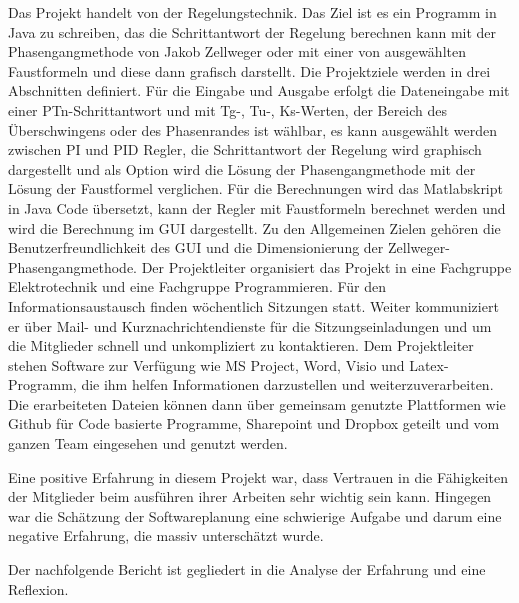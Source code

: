 Das Projekt handelt von der Regelungstechnik. Das Ziel ist es ein Programm in Java zu schreiben,
das die Schrittantwort der Regelung berechnen kann mit der Phasengangmethode von Jakob Zellweger
oder mit einer von ausgewählten Faustformeln und diese dann grafisch darstellt.\textcurrency 
Die Projektziele werden in drei Abschnitten definiert. Für die Eingabe und Ausgabe erfolgt die
Dateneingabe mit einer PTn-Schrittantwort und mit Tg-, Tu-, Ks-Werten, der Bereich des Überschwingens
oder des Phasenrandes ist wählbar, es kann ausgewählt werden zwischen PI und PID Regler, die
Schrittantwort der Regelung wird graphisch dargestellt und als Option wird die Lösung der Phasengangmethode
mit der Lösung der Faustformel verglichen. Für die Berechnungen wird das Matlabskript in Java
Code übersetzt, kann der Regler mit Faustformeln berechnet werden und wird die Berechnung im GUI
dargestellt. Zu den Allgemeinen Zielen gehören die Benutzerfreundlichkeit des GUI und die Dimensionierung
der Zellweger-Phasengangmethode.
Der Projektleiter organisiert das Projekt in eine Fachgruppe Elektrotechnik und eine Fachgruppe
Programmieren. Für den Informationsaustausch finden wöchentlich Sitzungen statt. Weiter kommuniziert
er über Mail- und Kurznachrichtendienste für die Sitzungseinladungen und um die Mitglieder schnell
und unkompliziert zu kontaktieren. Dem Projektleiter stehen Software zur Verfügung wie MS Project,
Word, Visio und Latex-Programm, die ihm helfen Informationen darzustellen und weiterzuverarbeiten.
Die erarbeiteten Dateien können dann über gemeinsam genutzte Plattformen wie Github für Code basierte
Programme, Sharepoint und Dropbox geteilt und vom ganzen Team eingesehen und genutzt werden.

Eine positive Erfahrung in diesem Projekt war, dass Vertrauen in die Fähigkeiten der Mitglieder beim
ausführen ihrer Arbeiten sehr wichtig sein kann. Hingegen war die Schätzung der Softwareplanung eine
schwierige Aufgabe und darum eine negative Erfahrung, die massiv unterschätzt wurde.

Der nachfolgende Bericht ist gegliedert in die Analyse der Erfahrung und eine Reflexion.